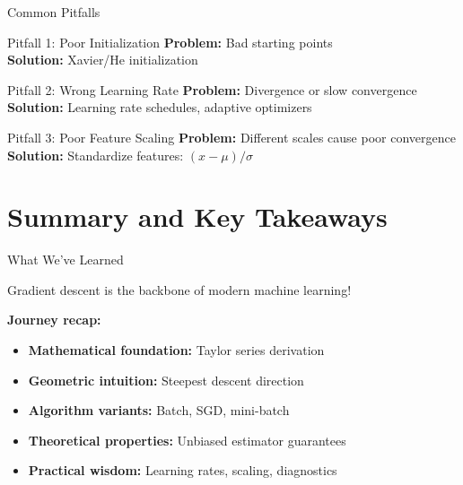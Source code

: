 \documentclass[usenames,dvipsnames]{beamer}
\begin{document}
  \begin{frame}{Common Pitfalls}
    \begin{alertbox}{Pitfall 1: Poor Initialization}
    \textbf{Problem:} Bad starting points
    \\\textbf{Solution:} Xavier/He initialization
    \end{alertbox}
    
    \pause
    \begin{alertbox}{Pitfall 2: Wrong Learning Rate}
    \textbf{Problem:} Divergence or slow convergence
    \\\textbf{Solution:} Learning rate schedules, adaptive optimizers
    \end{alertbox}
    
    \pause
    \begin{alertbox}{Pitfall 3: Poor Feature Scaling}
    \textbf{Problem:} Different scales cause poor convergence
    \\\textbf{Solution:} Standardize features: $(x - \mu)/\sigma$
    \end{alertbox}
  \end{frame}

  \section{Summary and Key Takeaways}

  \begin{frame}{What We've Learned}
    \begin{keypointsbox}{}
    Gradient descent is the backbone of modern machine learning!
    \end{keypointsbox}
    
    \pause
    \textbf{Journey recap:}
    \begin{itemize}[<+->]
        \item \textbf{Mathematical foundation:} Taylor series derivation
        \item \textbf{Geometric intuition:} Steepest descent direction
        \item \textbf{Algorithm variants:} Batch, SGD, mini-batch
        \item \textbf{Theoretical properties:} Unbiased estimator guarantees
        \item \textbf{Practical wisdom:} Learning rates, scaling, diagnostics
    \end{itemize}
  \end{frame}
\end{document}
